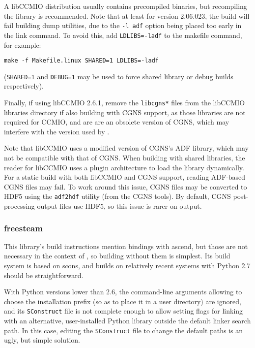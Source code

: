 \documentclass[a4paper,10pt,twoside]{csshortdoc}
\begin{document}
A libCCMIO distribution usually contains precompiled
binaries, but recompiling the library is recommended.
Note that at least for version 2.06.023, the build will fail
building dump utilities, due to the \texttt{-l adf} option
being placed too early in the link command. To avoid this,
add \texttt{LDLIBS=-ladf} to the makefile command, for example:

\texttt{make -f Makefile.linux SHARED=1 LDLIBS=-ladf}

(\texttt{SHARED=1} and \texttt{DEBUG=1} may be used to force
shared library or debug builds respectively).

Finally, if using libCCMIO 2.6.1, remove the \texttt{libcgns*}
files from the libCCMIO libraries directory if also building
\CS with CGNS support, as those libraries are not required
for CCMIO, and are are an obsolete version of CGNS, which
may interfere with the version used by \CS.

Note that libCCMIO uses a modified version of CGNS's ADF library,
which may not be compatible with that of CGNS. When building
with shared libraries, the reader for libCCMIO uses a plugin
architecture to load the library dynamically. For a static
build with both libCCMIO and CGNS support, reading ADF-based
CGNS files may fail. To work around this issue, CGNS files
may be converted to HDF5 using the \texttt{adf2hdf} utility
(from the CGNS tools). By default, CGNS post-processing output
files use HDF5, so this issue is rarer on output.

\subsubsection{freesteam\label{sec:ext:freesteam}}

This library's build instructions mention bindings with ascend,
but those are not necessary in the context of \CS, so building
without them is simplest. Its build system is based on scons,
and builds on relatively recent systems with Python 2.7 should
be straightforward.

With Python versions lower than 2.6, the command-line arguments
allowing to choose the installation prefix (so as to place it
in a user directory) are ignored, and its \texttt{SConstruct}
file is not complete enough to allow setting flags for linking
with an alternative, user-installed Python library outside
the default linker search path. In this case, editing the
\texttt{SConstruct} file to change the default paths is
an ugly, but simple solution.
\end{document}
